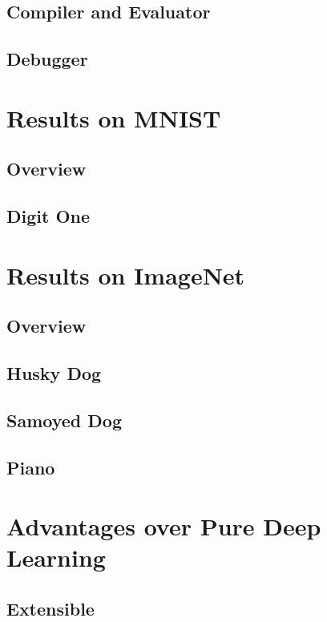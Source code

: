 \documentclass[11pt]{article} 	%
\theoremstyle{definition}
\begin{document}
\subsection{Compiler and Evaluator}

\subsection{Debugger}


\section{Results on MNIST}

\subsection{Overview}

\subsection{Digit One}


\section{Results on ImageNet}

\subsection{Overview}

\subsection{Husky Dog}

\subsection{Samoyed Dog}

\subsection{Piano}

\section{Advantages over Pure Deep Learning}

\subsection{Extensible}
\end{document}
